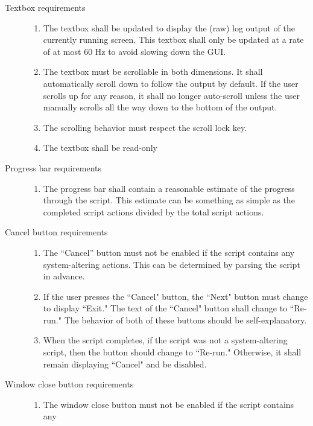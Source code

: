 \begin{description}
\item[Textbox requirements] \hfill 
\begin{enumerate}
  \item The textbox shall be updated to display the (raw) log output of the
  currently running screen.  This textbox shall only be updated at a rate of 
  at most 60 Hz to avoid slowing down the GUI.
  \item The textbox must be scrollable in both dimensions.  It shall
  automatically scroll down to follow the output by default.  If the user
  scrolls up for any reason, it shall no longer auto-scroll unless the user
  manually scrolls all the way down to the bottom of the output.
  \item The scrolling behavior must respect the scroll lock key.
  \item The textbox shall be read-only
\end{enumerate}
\item[Progress bar requirements] \hfill
\begin{enumerate}
  \item The progress bar shall contain a reasonable estimate of the progress
  through the script.  This estimate can be something as simple as the completed
  script actions divided by the total script actions.
\end{enumerate}
\item[Cancel button requirements] \hfill 
\begin{enumerate}
  \item The ``Cancel'' button must not be enabled if the script contains any 
  system-altering actions.  This can be determined by parsing the script in 
  advance.
  \item If the user presses the ``Cancel" button, the ``Next" button must  
  change to display ``Exit."  The text of the ``Cancel" button shall change to
  ``Re-run."  The behavior of both of these buttons should be self-explanatory.
  \item When the script completes, if the script was not a system-altering
  script, then the button should change to ``Re-run."  Otherwise, it shall
  remain displaying ``Cancel" and be disabled.
\end{enumerate}
\item[Window close button requirements] \hfill 
\begin{enumerate}
  \item The window close button must not be enabled if the script contains any 

\end{enumerate}
\end{description}
